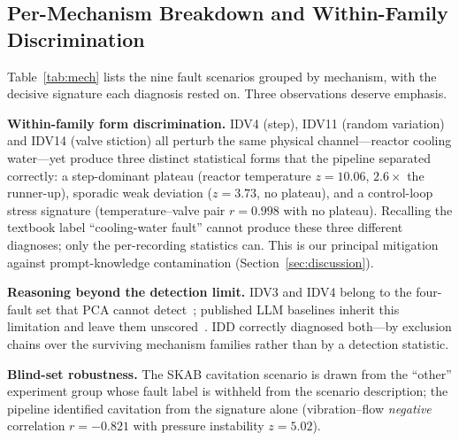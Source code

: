\documentclass[journal]{IEEEtran}
\begin{document}
\subsection{Per-Mechanism Breakdown and Within-Family Discrimination}
Table~\ref{tab:mech} lists the nine fault scenarios grouped by mechanism, with the decisive signature each diagnosis rested on. Three observations deserve emphasis.

\textbf{Within-family form discrimination.} IDV4 (step), IDV11 (random variation) and IDV14 (valve stiction) all perturb the same physical channel---reactor cooling water---yet produce three distinct statistical forms that the pipeline separated correctly: a step-dominant plateau (reactor temperature $z{=}10.06$, $2.6\times$ the runner-up), sporadic weak deviation ($z{=}3.73$, no plateau), and a control-loop stress signature (temperature--valve pair $r{=}0.998$ with no plateau). Recalling the textbook label ``cooling-water fault'' cannot produce these three different diagnoses; only the per-recording statistics can. This is our principal mitigation against prompt-knowledge contamination (Section~\ref{sec:discussion}).

\textbf{Reasoning beyond the detection limit.} IDV3 and IDV4 belong to the four-fault set that PCA cannot detect~\cite{chiang2001fault}; published LLM baselines inherit this limitation and leave them unscored~\cite{khan2024faultexplainer}. IDD correctly diagnosed both---by exclusion chains over the surviving mechanism families rather than by a detection statistic.

\textbf{Blind-set robustness.} The SKAB cavitation scenario is drawn from the ``other'' experiment group whose fault label is withheld from the scenario description; the pipeline identified cavitation from the signature alone (vibration--flow \emph{negative} correlation $r{=}{-}0.821$ with pressure instability $z{=}5.02$).
\end{document}
